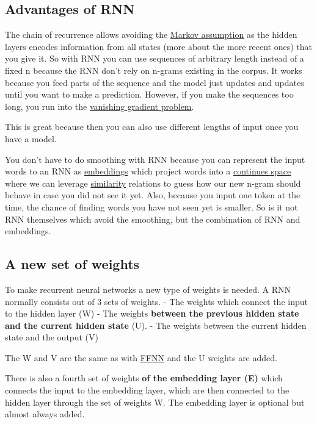 \documentclass[
  11pt,
  british,
]{article}
\begin{document}
\hypertarget{advantages-of-rnn}{%
\subsection{Advantages of RNN}\label{advantages-of-rnn}}

The chain of recurrence allows avoiding the
\href{Prediction/Markov\%20assumption.md}{Markov assumption} as the
hidden layers encodes information from all states (more about the more
recent ones) that you give it. So with RNN you can use sequences of
arbitrary length instead of a fixed n because the RNN don't rely on
n-grams existing in the corpus. It works because you feed parts of the
sequence and the model just updates and updates until you want to make a
prediction. However, if you make the sequences too long, you run into
the \href{Vanishing\%20gradient\%20problem.md}{vanishing gradient
problem}.

This is great because then you can also use different lengths of input
once you have a model.

You don't have to do smoothing with RNN because you can represent the
input words to an RNN as
\href{Semantic-Similarity/Embeddings.md}{embeddings} which project words
into a \href{Semantic-Similarity/Vector\%20Space.md}{continues space}
where we can leverage
\href{Semantic-Similarity/Similarity.md}{similarity} relations to guess
how our new n-gram should behave in case you did not see it yet. Also,
because you input one token at the time, the chance of finding words you
have not seen yet is smaller. So is it not RNN themselves which avoid
the smoothing, but the combination of RNN and embeddings.

\hypertarget{a-new-set-of-weights}{%
\subsection{A new set of weights}\label{a-new-set-of-weights}}

To make recurrent neural networks a new type of weights is needed. A RNN
normally consists out of 3 sets of weights. - The weights which connect
the input to the hidden layer (W) - The weights \textbf{between the
previous hidden state and the current hidden state} (U). - The weights
between the current hidden state and the output (V)

The W and V are the same as with
\href{Feed\%20forward\%20neural\%20networks\%20(FFNN).md}{FFNN} and the
U weights are added.

There is also a fourth set of weights \textbf{of the embedding layer
(E)} which connects the input to the embedding layer, which are then
connected to the hidden layer through the set of weights W. The
embedding layer is optional but almost always added.
\end{document}
